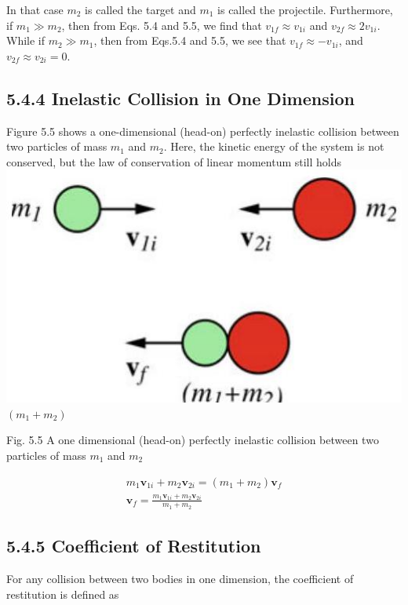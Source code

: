 \documentclass[10pt]{article}
\begin{document}
In that case $m_{2}$ is called the target and $m_{1}$ is called the projectile. Furthermore, if $m_{1} \gg m_{2}$, then from Eqs. 5.4 and 5.5, we find that $v_{1 f} \approx v_{1 i}$ and $v_{2 f} \approx 2 v_{1 i}$. While if $m_{2} \gg m_{1}$, then from Eqs.5.4 and 5.5, we see that $v_{1 f} \approx-v_{1 i}$, and $v_{2 f} \approx v_{2 i}=0$.

\subsection*{5.4.4 Inelastic Collision in One Dimension}
Figure 5.5 shows a one-dimensional (head-on) perfectly inelastic collision between two particles of mass $m_{1}$ and $m_{2}$. Here, the kinetic energy of the system is not conserved, but the law of conservation of linear momentum still holds\\
\includegraphics[max width=\textwidth, center]{2024_09_13_db1f357d2aad0a03eb2eg-086}\\
$\left(m_{1}+m_{2}\right)$

Fig. 5.5 A one dimensional (head-on) perfectly inelastic collision between two particles of mass $m_{1}$ and $m_{2}$

$$
\begin{gathered}
m_{1} \mathbf{v}_{1 i}+m_{2} \mathbf{v}_{2 i}=\left(m_{1}+m_{2}\right) \mathbf{v}_{f} \\
\mathbf{v}_{f}=\frac{m_{1} \mathbf{v}_{1 i}+m_{2} \mathbf{v}_{2 i}}{m_{1}+m_{2}}
\end{gathered}
$$

\subsection*{5.4.5 Coefficient of Restitution}
For any collision between two bodies in one dimension, the coefficient of restitution is defined as
\end{document}
